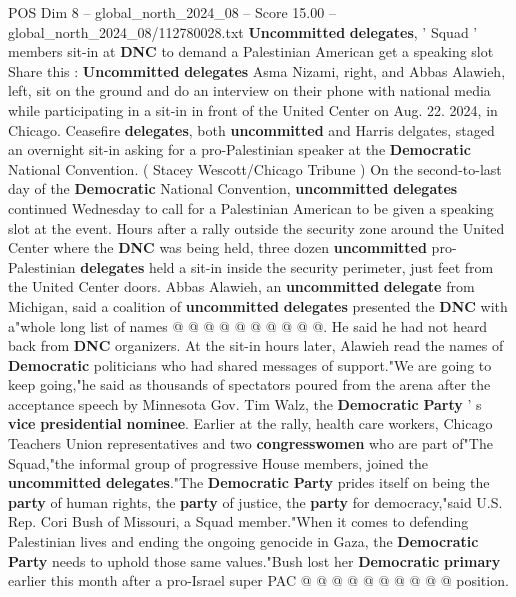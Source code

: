 \begin{textsample}{POS Dim 8 – global\_north\_2024\_08 – Score 15.00 – global\_north\_2024\_08/112780028.txt}  \label{ex:f8_pos_034}
\textbf{Uncommitted} \textbf{delegates}, ' Squad ' members sit-in at \textbf{DNC} to demand a Palestinian American get a speaking slot Share this : \textbf{Uncommitted} \textbf{delegates} Asma Nizami, right, and Abbas Alawieh, left, sit on the ground and do an interview on their phone with national media while participating in a sit-in in front of the United Center on Aug. 22. 2024, in Chicago.
Ceasefire \textbf{delegates}, both \textbf{uncommitted} and Harris delgates, staged an overnight sit-in asking for a pro-Palestinian speaker at the \textbf{Democratic} National Convention. ( Stacey Wescott/Chicago Tribune ) On the second-to-last day of the \textbf{Democratic} National Convention, \textbf{uncommitted} \textbf{delegates} continued Wednesday to call for a Palestinian American to be given a speaking slot at the event.
Hours after a rally outside the security zone around the United Center where the \textbf{DNC} was being held, three dozen \textbf{uncommitted} pro-Palestinian \textbf{delegates} held a sit-in inside the security perimeter, just feet from the United Center doors.
Abbas Alawieh, an \textbf{uncommitted} \textbf{delegate} from Michigan, said a coalition of \textbf{uncommitted} \textbf{delegates} presented the \textbf{DNC} with a"whole long list of names @ @ @ @ @ @ @ @ @ @.
He said he had not heard back from \textbf{DNC} organizers.
At the sit-in hours later, Alawieh read the names of \textbf{Democratic} politicians who had shared messages of support."We are going to keep going,"he said as thousands of spectators poured from the arena after the acceptance speech by Minnesota Gov.
Tim Walz, the \textbf{Democratic} \textbf{Party} ' s \textbf{vice} \textbf{presidential} \textbf{nominee}.
Earlier at the rally, health care workers, Chicago Teachers Union representatives and two \textbf{congresswomen} who are part of"The Squad,"the informal group of progressive House members, joined the \textbf{uncommitted} \textbf{delegates}."The \textbf{Democratic} \textbf{Party} prides itself on being the \textbf{party} of human rights, the \textbf{party} of justice, the \textbf{party} for democracy,"said U.S.
Rep.
Cori Bush of Missouri, a Squad member."When it comes to defending Palestinian lives and ending the ongoing genocide in Gaza, the \textbf{Democratic} \textbf{Party} needs to uphold those same values."Bush lost her \textbf{Democratic} \textbf{primary} earlier this month after a pro-Israel super PAC @ @ @ @ @ @ @ @ @ @ position.

\end{textsample}
